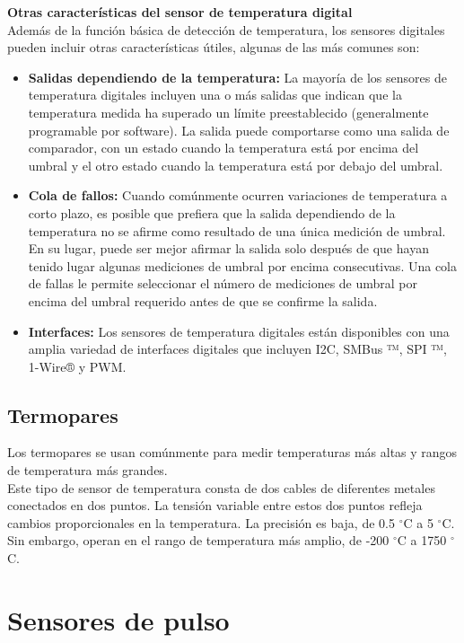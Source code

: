     \textbf{Otras características del sensor de temperatura digital}\\
    Además de la función básica de detección de temperatura, los sensores digitales pueden incluir otras características útiles, algunas de las más comunes son:
    \begin{itemize}
    	\item \textbf{Salidas dependiendo de la temperatura:} La mayoría de los sensores de temperatura digitales incluyen una o más salidas que indican que la temperatura medida ha superado un límite preestablecido (generalmente programable por software). La salida puede comportarse como una salida de comparador, con un estado cuando la temperatura está por encima del umbral y el otro estado cuando la temperatura está por debajo del umbral.
    	
    	\item \textbf{Cola de fallos:} Cuando comúnmente ocurren variaciones de temperatura a corto plazo, es posible que prefiera que la salida dependiendo de la temperatura no se afirme como resultado de una única medición de umbral. En su lugar, puede ser mejor afirmar la salida solo después de que hayan tenido lugar algunas mediciones de umbral por encima consecutivas. Una cola de fallas le permite seleccionar el número de mediciones de umbral por encima del umbral requerido antes de que se confirme la salida.
    	
    	\item \textbf{Interfaces:} Los sensores de temperatura digitales están disponibles con una amplia variedad de interfaces digitales que incluyen I2C, SMBus ™, SPI ™, 1-Wire® y PWM.
    \end{itemize}
	
			
	\subsection{Termopares}
	Los termopares se usan comúnmente para medir temperaturas más altas y rangos de temperatura más grandes.\\
			
	Este tipo de sensor de temperatura consta de dos cables de diferentes metales conectados en dos puntos. La tensión variable entre estos dos puntos refleja cambios proporcionales en la temperatura. La precisión es baja, de 0.5 $^{\circ}$C a 5 $^{\circ}$C. Sin embargo, operan en el rango de temperatura más amplio, de -200 $^{\circ}$C a 1750 $^{\circ}$C.			
	
	
	\section{Sensores de pulso}
	
